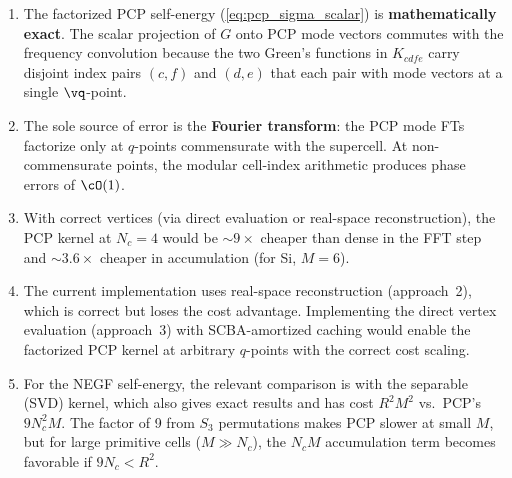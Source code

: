 \begin{enumerate}
  \item The factorized PCP self-energy
    (\cref{eq:pcp_sigma_scalar}) is \textbf{mathematically exact}.
    The scalar projection of $G$ onto PCP mode vectors commutes
    with the frequency convolution because the two Green's functions
    in $K_{cdfe}$ carry disjoint index pairs $(c,f)$ and $(d,e)$
    that each pair with mode vectors at a single $\vq$-point.

  \item The sole source of error is the \textbf{Fourier transform}:
    the PCP mode FTs factorize only at $q$-points commensurate with
    the supercell.  At non-commensurate points, the modular
    cell-index arithmetic produces phase errors of $\cO(1)$.

  \item With correct vertices (via direct evaluation or real-space
    reconstruction), the PCP kernel at $N_c = 4$ would be
    $\sim 9\times$ cheaper than dense in the FFT step and
    $\sim 3.6\times$ cheaper in accumulation (for Si, $M = 6$).

  \item The current implementation uses real-space reconstruction
    (approach~2), which is correct but loses the cost advantage.
    Implementing the direct vertex evaluation (approach~3) with
    SCBA-amortized caching would enable the factorized PCP kernel
    at arbitrary $q$-points with the correct cost scaling.

  \item For the NEGF self-energy, the relevant comparison is with
    the separable (SVD) kernel, which also gives exact results and
    has cost $R^2 M^2$ vs.\ PCP's $9 N_c^2 M$.  The factor of 9
    from $S_3$ permutations makes PCP slower at small $M$, but for
    large primitive cells ($M \gg N_c$), the $N_c M$ accumulation
    term becomes favorable if $9 N_c < R^2$.
\end{enumerate}
